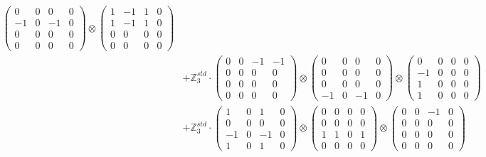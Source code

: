 \documentclass{article}
\begin{document}
{\begin{align}
            \begin{pmatrix} 0 & 0 & 0 & 0 \\ -1 & 0 & -1 & 0 \\ 0 & 0 & 0 & 0 \\ 0 & 0 & 0 & 0 \end{pmatrix} \otimes 
            \begin{pmatrix} 1 & -1 & 1 & 0 \\ 1 & -1 & 1 & 0 \\ 0 & 0 & 0 & 0 \\ 0 & 0 & 0 & 0 \end{pmatrix} \\ 
        &+ \label{Rs16-Rc11-Solution-3-c20} \mathbb{Z}_3^{std} \cdot 
            \begin{pmatrix} 0 & 0 & -1 & -1 \\ 0 & 0 & 0 & 0 \\ 0 & 0 & 0 & 0 \\ 0 & 0 & 0 & 0 \end{pmatrix} \otimes 
            \begin{pmatrix} 0 & 0 & 0 & 0 \\ 0 & 0 & 0 & 0 \\ 0 & 0 & 0 & 0 \\ -1 & 0 & -1 & 0 \end{pmatrix} \otimes 
            \begin{pmatrix} 0 & 0 & 0 & 0 \\ -1 & 0 & 0 & 0 \\ 1 & 0 & 0 & 0 \\ 1 & 0 & 0 & 0 \end{pmatrix} \\ 
        &+ \label{Rs16-Rc11-Solution-3-c21} \mathbb{Z}_3^{std} \cdot 
            \begin{pmatrix} 1 & 0 & 1 & 0 \\ 0 & 0 & 0 & 0 \\ -1 & 0 & -1 & 0 \\ 1 & 0 & 1 & 0 \end{pmatrix} \otimes 
            \begin{pmatrix} 0 & 0 & 0 & 0 \\ 0 & 0 & 0 & 0 \\ 1 & 1 & 0 & 1 \\ 0 & 0 & 0 & 0 \end{pmatrix} \otimes 
            \begin{pmatrix} 0 & 0 & -1 & 0 \\ 0 & 0 & 0 & 0 \\ 0 & 0 & 0 & 0 \\ 0 & 0 & 0 & 0 \end{pmatrix} \\ 

\end{align}}
\end{document}
